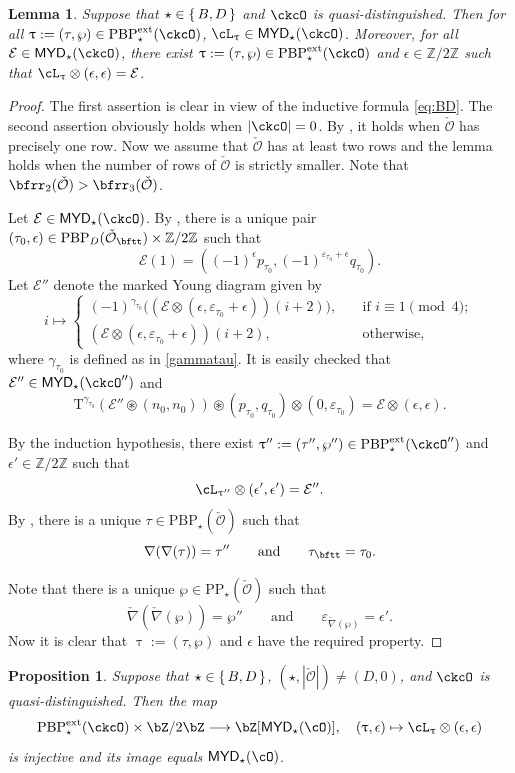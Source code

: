 \documentclass[11pt,a4paper]{amsart}
\def\MYD{{\mathsf{MYD}}}
\def\abs#1{\left|{#1}\right|}
\newcommand{\CE}{{\mathcal {E}}}
\newcommand{\CO}{{\mathcal {O}}}
\newcommand{\Z}{\mathbb{Z}}
\newcommand{\be}{\begin {equation}}
\newcommand{\ee}{\end {equation}}
\numberwithin{equation}{section}
\newtheorem{lem}[thm]{Lemma}
\newtheorem{prop}[thm]{Proposition}
\theoremstyle{remark}
\def\PBPe{\mathrm{PBP}^{\mathrm{ext}}}
\def\PBPes{\mathrm{PBP}^{\mathrm{ext}}_{\star}}
\def\PP{\mathrm{PP}}
\def\PBP{\mathrm{PBP}}
\def\MYD{{\mathsf{MYD}}}
\def\ac{\cL}
\begin{document}
\begin{lem}\label{lem:BD22223}
Suppose that $\star \in \set{B,D}$ and 
$\ckcO$ is quasi-distinguished. Then for all $\uptau:=(\tau, \wp)\in \PBPe_\star(\ckcO)$, 
$ \ac_{\uptau}\in \MYD_\star(\ckcO)$. Moreover, for all $\CE\in \MYD_\star(\ckcO)$, there exist  $\uptau:=(\tau, \wp)\in \PBPe_\star(\ckcO)$ and $\epsilon\in \Z/2\Z$ such that 
$\ac_\uptau\otimes (\epsilon, \epsilon)=\CE$. 
\end{lem}
\begin{proof}
The first assertion is clear in view of the inductive formula \eqref{eq:BD}. 
The second assertion obviously holds when $\abs{\ckcO}=0$. By , it holds when $\check \CO$ has precisely one row.  
Now we assume that $\check \CO$ has at least two rows and the lemma holds when the number of rows of $\check \CO$ is strictly smaller.  Note that $\bfrr_2(\check \CO)>\bfrr_3(\check \CO)$. 




Let  $\CE\in \MYD_\star(\ckcO)$. By , there is a unique pair $(\tau_0, \epsilon)\in \PBP_D(\check \CO_\bftt)\times \Z/2\Z$ such that 
\[
  \CE(1)=((-1)^\epsilon p_{\tau_0}, (-1)^{\varepsilon_{\tau_0}+\epsilon} q_{\tau_0}).
\]
Let $\CE''$ denote the marked Young diagram given by
\[
i\mapsto \begin{cases}
     (-1)^{\gamma_{\tau_0}} \big((\CE\otimes (\epsilon, \varepsilon_{\tau_0}+\epsilon))(i+2)\big),\quad &\textrm{if $i\equiv 1 \pmod{4}$};\\
     (\CE\otimes (\epsilon, \varepsilon_{\tau_0}+\epsilon))(i+2),\quad &\textrm{otherwise},
  \end{cases}
\]
where $\gamma_{\tau_0}$ is defined as in \eqref{gammatau}. 
It is easily checked that $\CE''\in \MYD_\star(\ckcO'')$ and
\[
  \mathrm T^{\gamma_{\tau_0}}(\CE''\circledast (n_0,n_0))\circledast (p_{\tau_0},q_{\tau_0}) \otimes (0, \varepsilon_{\tau_0})=\CE\otimes (\epsilon, \epsilon). 
\] 

By the induction hypothesis, there exist $\uptau'':=(\tau'', \wp'')\in \PBPe_\star(\ckcO'')$ and $\epsilon'\in \Z/2\Z$  such that 
\[
\ac_{\uptau''}\otimes (\epsilon', \epsilon')=\CE''.
\]
By , there is a unique $\tau\in \PBP_\star(\check \CO)$ such that
\[
  \nabla(\nabla(\tau))=\tau''\qquad\textrm{and}\qquad \tau_\bftt=\tau_0.
\]

Note that there is a unique $\wp\in \PP_\star(\check \CO)$ such that
\[
 \check \nabla( \check \nabla(\wp))=\wp''\qquad \textrm{and}\qquad 
 \varepsilon_{\check \nabla(\wp)}=\epsilon'.
\]
Now it is clear that $\uptau:=(\tau, \wp)$ and $\epsilon$ have the required property. 
\end{proof}
\begin{prop}\label{lem:BDinj0}
Suppose that $\star \in \set{B,D}$, $(\star, \abs{\check \CO})\neq (D, 0)$, and 
$\ckcO$ is quasi-distinguished. Then the map 
 \be\label{acme0}
    \PBPes( \ckcO )\times \bZ/2\bZ \longrightarrow \bZ[\MYD_{\star}(\cO)],\quad
    (\uptau,\epsilon) \mapsto \ac_{\uptau}\otimes (\epsilon, \epsilon)
  \ee
is injective and its image equals $\MYD_{\star}(\cO)$.
\end{prop}
\end{document}
